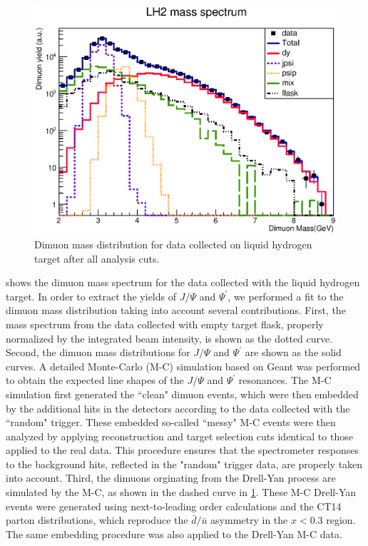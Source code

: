 \documentclass[reprint,aps,unsortedaddress,superscriptaddress,prd,floatfix,showpacs,linenumbers]{revtex4-2}
\begin{document}
\begin{figure}
	\includegraphics[width=\linewidth]{massFit/LH2_massfit}
	\caption{Dimuon mass distribution for data collected on liquid hydrogen target
		after all analysis cuts.}
	\label{fig:massfit_LH2}
\end{figure}
 shows the dimuon mass spectrum for the data collected with the
liquid hydrogen target. In order to extract the yields of $J/\Psi$ and
$\Psi^\prime$, we performed a fit to the dimuon mass distribution taking
into account several contributions. First, the mass spectrum from the
data collected with empty target flask, properly normalized by the
integrated beam intensity, is shown as the dotted curve. Second, the 
dimuon mass distributions for $J/\Psi$ and $\Psi^\prime$ are shown as
the solid curves. A detailed Monte-Carlo (M-C) simulation based on Geant was
performed to obtain the expected line shapes of the $J/\Psi$ and $\Psi^\prime$
resonances. The M-C simulation first generated the ``clean" dimuon events,
which were then embedded by the additional hits in the detectors according to
the data collected with the ``random" trigger. These embedded 
so-called ``messy" M-C events were then analyzed by applying reconstruction
and target selection cuts identical to those applied to the real data. This
procedure ensures that the spectrometer responses to the background hits, 
reflected in the "random" trigger data, are properly taken into account.
Third, the dimuons orginating from the Drell-Yan process are simulated
by the M-C, as shown in the dashed curve in \cref{fig:massfit_LH2}. These M-C
Drell-Yan events were generated using next-to-leading order
calculations and the CT14 parton distributions,
which reproduce the $\bar{d}/ \bar{u}$ asymmetry in the $x < 0.3$ region.
The same embedding procedure was also applied to the Drell-Yan M-C data.
\end{document}
